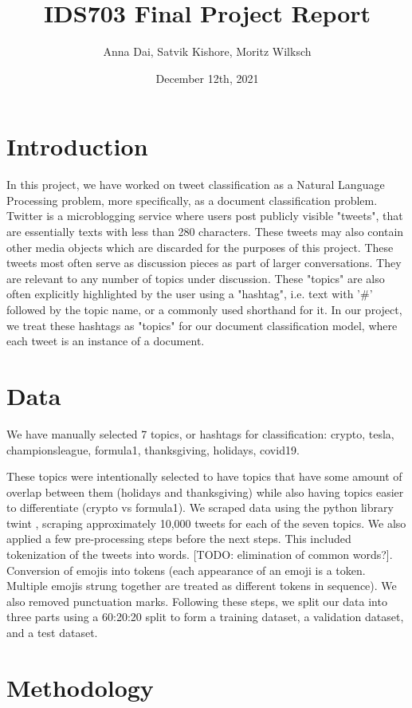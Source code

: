 \documentclass[11pt]{article}
\title{\vspace{-1.5cm}IDS703 Final Project Report}
\author{Anna Dai, Satvik Kishore, Moritz Wilksch}
\date{December 12th, 2021}
\begin{document}
\maketitle

\section{Introduction}

In this project, we have worked on tweet classification as a Natural Language Processing problem, more specifically, as a document classification problem. Twitter is a microblogging service where users post publicly visible "tweets", that are essentially texts with less than 280 characters. These tweets may also contain other media objects which are discarded for the purposes of this project. These tweets most often serve as discussion pieces as part of larger conversations. They are relevant to any number of topics under discussion. These "topics" are also often explicitly highlighted by the user using a "hashtag", i.e. text with '\#' followed by the topic name, or a commonly used shorthand for it. In our project, we treat these hashtags as "topics" for our document classification model, where each tweet is an instance of a document.

\section{Data}
We have manually selected 7 topics, or hashtags for classification: crypto, tesla, championsleague, formula1, thanksgiving, holidays, covid19.

These topics were intentionally selected to have topics that have some amount of overlap between them (holidays and thanksgiving) while also having topics easier to differentiate (crypto vs formula1). We scraped data using the python library twint \cite{twint}, scraping approximately 10,000 tweets for each of the seven topics. We also applied a few pre-processing steps before the next steps. This included tokenization of the tweets into words. [TODO: elimination of common words?]. Conversion of emojis into tokens (each appearance of an emoji is a token. Multiple emojis strung together are treated as different tokens in sequence). We also removed punctuation marks. Following these steps, we split our data into three parts using a 60:20:20 split to form a training dataset, a validation dataset, and a test dataset. 

\section{Methodology}
\end{document}

